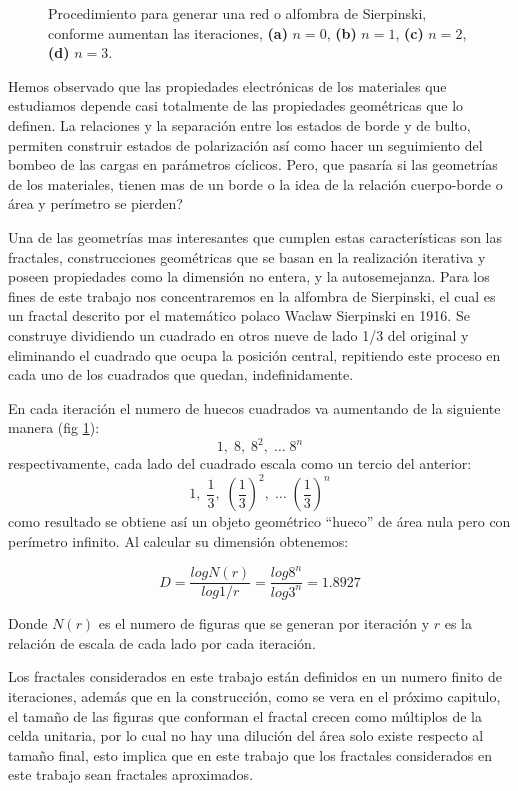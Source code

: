 \begin{figure}[h!]
\begin{subfigure}[b!]{0.27 \textwidth}
     \end{subfigure}
        \caption{Procedimiento para generar una red o alfombra de Sierpinski, conforme aumentan las iteraciones, \textbf{(a)} $n=0$, \textbf{(b)} $n=1$, \textbf{(c)} $n=2$,\textbf{(d)} $n=3$.}
        \label{fig:Fractals}
\end{figure}

Hemos observado que las propiedades electrónicas de los materiales que estudiamos depende casi totalmente de las propiedades geométricas que lo definen. La relaciones y la separación entre los estados de borde y de bulto, permiten construir estados de polarización así como hacer un seguimiento del bombeo de las cargas en parámetros cíclicos. Pero, que pasaría si las geometrías de los materiales, tienen mas de un borde o la idea de la relación cuerpo-borde o área y perímetro se pierden? 

Una de las geometrías mas interesantes que cumplen estas características son las fractales, construcciones geométricas que se basan en la realización iterativa y poseen propiedades como la dimensión no entera, y la autosemejanza. Para los fines de este trabajo nos concentraremos en la alfombra de Sierpinski, el cual es un fractal descrito por el matemático polaco Waclaw Sierpinski en 1916. Se construye dividiendo un cuadrado en otros nueve de lado 1/3 del original y eliminando el cuadrado que ocupa la posición central, repitiendo este proceso en cada uno de los cuadrados que
quedan, indefinidamente.

En cada iteración el numero de huecos cuadrados va aumentando de la siguiente manera (fig \ref{fig:Fractals}):
\begin{equation}
    1,\; 8, \; 8^2,\;\dots\; 8^n
\end{equation}
respectivamente, cada lado del cuadrado escala como un tercio del anterior:
\begin{equation}
    1,\; \frac{1}{3}, \; \left( \frac{1}{3} \right)^2,\;\dots\; \left( \frac{1}{3} \right)^n
\end{equation}
como resultado se obtiene así un objeto geométrico “hueco” de área nula pero con perímetro infinito. Al calcular su dimensión obtenemos:

\begin{equation}
    D = \frac{log N(r)}{log 1/r} = \frac{log 8^n}{log 3^n} = 1.8927
\end{equation}

Donde $N(r)$ es el numero de figuras que se generan por iteración y $r$ es la relación de escala de cada lado por cada iteración.

Los fractales considerados en este trabajo están definidos en un numero finito de iteraciones, además que en la construcción, como se vera en el próximo capitulo, el tamaño de las figuras que conforman el fractal crecen como múltiplos de la celda unitaria, por lo cual no hay una dilución del área solo existe respecto al tamaño final, esto implica que en este trabajo que los fractales considerados en este trabajo sean fractales aproximados.

